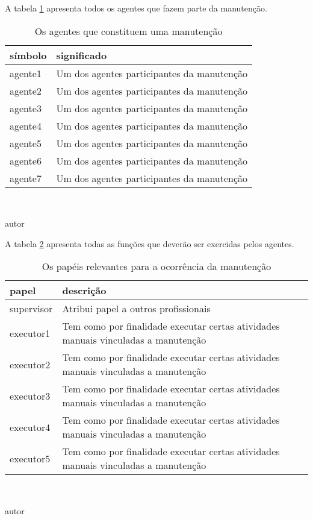 A tabela \ref{agents} apresenta todos os agentes que fazem parte da manutenção. 
\begin{table}[H]
\centering
\caption{Os agentes que constituem uma manutenção}
\begin{tabular}{|l|l|}
\hline
\textbf{símbolo} & \textbf{significado} \\ \hline
agente1 & Um dos agentes participantes da manutenção \\ \hline
agente2 & Um dos agentes participantes da manutenção \\ \hline
agente3 & Um dos agentes participantes da manutenção \\ \hline
agente4 & Um dos agentes participantes da manutenção \\ \hline
agente5 & Um dos agentes participantes da manutenção \\ \hline
agente6 & Um dos agentes participantes da manutenção \\ \hline
agente7 & Um dos agentes participantes da manutenção \\ \hline
\end{tabular}
\label{agents}
\\
\begin{center}
autor
\end{center}
\end{table}

A tabela \ref{roles} apresenta todas as funções que deverão ser exercidas pelos agentes.

\begin{table}[H]
\centering
\caption{Os papéis relevantes para a ocorrência da manutenção}
\begin{tabular}{|l|l|}
\hline
\textbf{papel} & \textbf{descrição} \\ \hline
supervisor & Atribui papel a outros profissionais \\ \hline
executor1 & Tem como por finalidade executar certas atividades manuais vinculadas a manutenção \\ \hline
executor2 & Tem como por finalidade executar certas atividades manuais vinculadas a manutenção \\ \hline
executor3 & Tem como por finalidade executar certas atividades manuais vinculadas a manutenção \\ \hline
executor4 & Tem como por finalidade executar certas atividades manuais vinculadas a manutenção \\ \hline
executor5 & Tem como por finalidade executar certas atividades manuais vinculadas a manutenção \\ \hline
\end{tabular}
\label{roles}
\\
\begin{center}
autor
\end{center}
\end{table}

